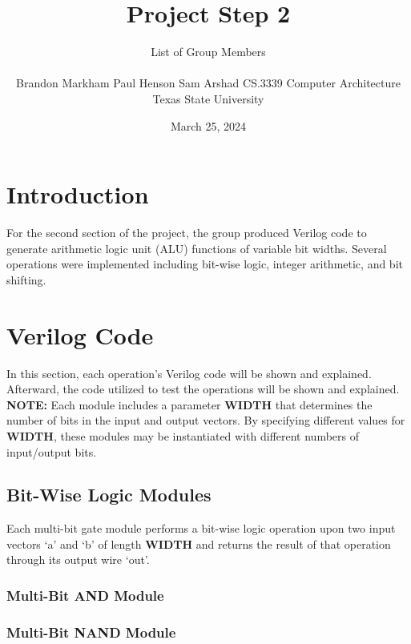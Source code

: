 \documentclass[12pt]{article}
\title{Project Step 2}
\author{List of Group Members\\
\AND\\ 
\AND Brandon Markham
\AND Paul Henson
\AND Sam Arshad
\AND
\AND
\AND
	CS.3339 Computer Architecture\\
\AND
	Texas State University\\
}
\date{March 25, 2024}
\begin{document}
\maketitle

\newpage
\thispagestyle{empty}


\newpage
\setcounter{page}{1}
\section{Introduction}
For the second section of the project, the group produced Verilog code to generate arithmetic logic unit (ALU) functions of variable bit widths. Several operations were implemented including bit-wise logic, integer arithmetic, and bit shifting.


\section{Verilog Code}
\label{sec:headings}
In this section, each operation's Verilog code will be shown and explained. Afterward, the code utilized to test the operations will be shown and explained.\\

\textbf{NOTE:} 
Each module includes a parameter \textbf{WIDTH} that determines the number of bits
in the input and output vectors. By specifying different values for \textbf{WIDTH}, these modules may be 
instantiated with different numbers of input/output bits.\\




\subsection{Bit-Wise Logic Modules}
Each multi-bit gate module performs a bit-wise logic operation upon two input vectors `a' and `b' of length \textbf{WIDTH} 
and returns the result of that operation through its output wire `out'.

\subsubsection{Multi-Bit AND Module}


\subsubsection{Multi-Bit NAND Module}

\end{document}
